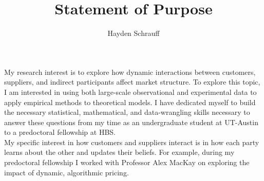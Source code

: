 \documentclass{article}
\title{Statement of Purpose}
\author{Hayden Schrauff}
\date{}
\begin{document}
    \maketitle
    \vspace{0.1in}
    
My research interest is to explore how dynamic interactions between customers, suppliers, and indirect participants affect market structure. To explore this topic, I am interested in using both large-scale observational and experimental data to apply empirical methods to theoretical models. I have dedicated myself to build the necessary statistical, mathematical, and data-wrangling skills necessary to answer these questions from my time as an undergraduate student at UT-Austin to a  predoctoral fellowship at HBS. \\

My specific interest in how customers and suppliers interact is in how each party learns about the other and updates their beliefs. For example, during my predoctoral fellowship I worked with Professor Alex MacKay on exploring the impact of dynamic, algorithmic pricing. \parencite{https://doi.org/10.3982/ECTA16180}

\printbibliography
\end{document}
